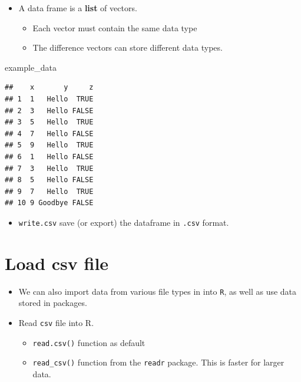 \documentclass[]{book}
\newenvironment{Shaded}{\begin{snugshade}}{\end{snugshade}}
\newcommand{\NormalTok}[1]{#1}
\providecommand{\tightlist}{%
  \setlength{\itemsep}{0pt}\setlength{\parskip}{0pt}}
\begin{document}
\begin{itemize}
\tightlist
\item
  A data frame is a \textbf{list} of vectors.

  \begin{itemize}
  \tightlist
  \item
    Each vector must contain the same data type
  \item
    The difference vectors can store different data types.
  \end{itemize}
\end{itemize}

\begin{Shaded}
\begin{Highlighting}[]
\NormalTok{example_data}
\end{Highlighting}
\end{Shaded}

\begin{verbatim}
##    x       y     z
## 1  1   Hello  TRUE
## 2  3   Hello FALSE
## 3  5   Hello  TRUE
## 4  7   Hello FALSE
## 5  9   Hello  TRUE
## 6  1   Hello FALSE
## 7  3   Hello  TRUE
## 8  5   Hello FALSE
## 9  7   Hello  TRUE
## 10 9 Goodbye FALSE
\end{verbatim}

\begin{itemize}
\tightlist
\item
  \texttt{write.csv} save (or export) the dataframe in \texttt{.csv}
  format.
\end{itemize}

\section{Load csv file}\label{load-csv-file}

\begin{itemize}
\tightlist
\item
  We can also import data from various file types in into \texttt{R}, as
  well as use data stored in packages.
\item
  Read \texttt{csv} file into R.

  \begin{itemize}
  \tightlist
  \item
    \texttt{read.csv()} function as default
  \item
    \texttt{read\_csv()} function from the \texttt{readr} package. This
    is faster for larger data.
  \end{itemize}
\end{itemize}
\end{document}

